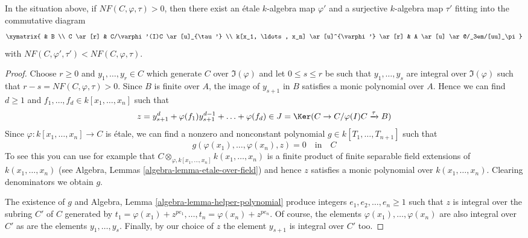 \begin{lemma}
\label{lemma-lower-invariant}
In the situation above, if $NF(C, \varphi, \tau) > 0$, then there exist
an \'etale $k$-algebra map $\varphi'$ and a surjective $k$-algebra map
$\tau'$ fitting into the commutative diagram
$$
\xymatrix{
& B \\
C \ar[r] & C/\varphi'(I)C \ar[u]_{\tau'} \\
k[x_1, \ldots, x_n] \ar[u]^{\varphi'} \ar[r] &
A \ar[u] \ar@/_3em/[uu]_\pi
}
$$
with $NF(C, \varphi', \tau') < NF(C, \varphi, \tau)$.
\end{lemma}

\begin{proof}
Choose $r \geq 0$ and $y_1, \ldots, y_r \in C$ which generate
$C$ over $\Im(\varphi)$ and let $0 \leq s \leq r$ be such that
$y_1, \ldots, y_s$ are integral over $\Im(\varphi)$
such that $r - s = NF(C, \varphi, \tau) > 0$.
Since $B$ is finite over $A$, the image of $y_{s + 1}$ in $B$
satisfies a monic polynomial over $A$. Hence we can find
$d \geq 1$ and $f_1, \ldots, f_d \in k[x_1, \ldots, x_n]$
such that
$$
z = y_{s + 1}^d + \varphi(f_1) y_{s + 1}^{d - 1} + \ldots + \varphi(f_d) \in
J = \Ker(C \to C/\varphi(I)C \xrightarrow{\tau} B)
$$
Since $\varphi : k[x_1, \ldots, x_n] \to C$ is \'etale, we can find a
nonzero and nonconstant polynomial $g \in k[T_1, \ldots, T_{n + 1}]$
such that
$$
g(\varphi(x_1), \ldots, \varphi(x_n), z) = 0
\quad\text{in}\quad
C
$$
To see this you can use for example that
$C \otimes_{\varphi, k[x_1, \ldots, x_n]} k(x_1, \ldots, x_n)$
is a finite product of finite separable field extensions
of $k(x_1, \ldots, x_n)$
(see Algebra, Lemmas \ref{algebra-lemma-etale-over-field})
and hence $z$ satisfies a monic
polynomial over $k(x_1, \ldots, x_n)$. Clearing denominators
we obtain $g$.

\medskip\noindent
The existence of $g$ and
Algebra, Lemma \ref{algebra-lemma-helper-polynomial}
produce integers $e_1, e_2, \ldots, e_n \geq 1$ such that
$z$ is integral over the subring $C'$ of $C$ generated by
$t_1 = \varphi(x_1) + z^{pe_1}, \ldots, t_n = \varphi(x_n) + z^{pe_n}$.
Of course, the elements $\varphi(x_1), \ldots, \varphi(x_n)$
are also integral over $C'$ as are the elements
$y_1, \ldots, y_s$. Finally, by our choice of $z$ the element
$y_{s + 1}$ is integral over $C'$ too.


\end{proof}
